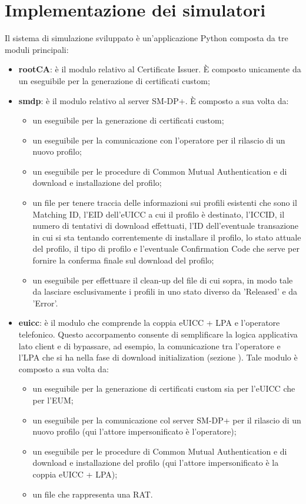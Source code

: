 \documentclass[10pt, oneside]{book}
\begin{document}
\section{Implementazione dei simulatori}
Il sistema di simulazione sviluppato è un'applicazione Python composta da tre moduli principali:
\begin{itemize}
\item \textbf{rootCA}: è il modulo relativo al Certificate Issuer. È composto unicamente da un eseguibile per la generazione di certificati custom;
\item \textbf{smdp}: è il modulo relativo al server SM-DP+. È composto a sua volta da:
\begin{itemize}
\item un eseguibile per la generazione di certificati custom;
\item un eseguibile per la comunicazione con l'operatore per il rilascio di un nuovo profilo;
\item un eseguibile per le procedure di Common Mutual Authentication e di download e installazione del profilo;
\item un file per tenere traccia delle informazioni sui profili esistenti che sono il Matching ID, l'EID dell'eUICC a cui il profilo è destinato, l'ICCID, il numero di tentativi di download effettuati, l'ID dell'eventuale transazione in cui si sta tentando correntemente di installare il profilo, lo stato attuale del profilo, il tipo di profilo e l'eventuale Confirmation Code che serve per fornire la conferma finale sul download del profilo;
\item un eseguibile per effettuare il clean-up del file di cui sopra, in modo tale da lasciare esclusivamente i profili in uno stato diverso da 'Released' e da 'Error'.
\end{itemize}
\item \textbf{euicc}: è il modulo che comprende la coppia eUICC + LPA e l'operatore telefonico. Questo accorpamento consente di semplificare la logica applicativa lato client e di bypassare, ad esempio, la comunicazione tra l'operatore e l'LPA che si ha nella fase di download initialization (sezione \label{sec:step-RSP}). Tale modulo è composto a sua volta da:
\begin{itemize}
\item un eseguibile per la generazione di certificati custom sia per l'eUICC che per l'EUM;
\item un eseguibile per la comunicazione col server SM-DP+ per il rilascio di un nuovo profilo (qui l'attore impersonificato è l'operatore);
\item un eseguibile per le procedure di Common Mutual Authentication e di download e installazione del profilo (qui l'attore impersonificato è la coppia eUICC + LPA);
\item un file che rappresenta una RAT.
\end{itemize}
\end{itemize}
\end{document}
